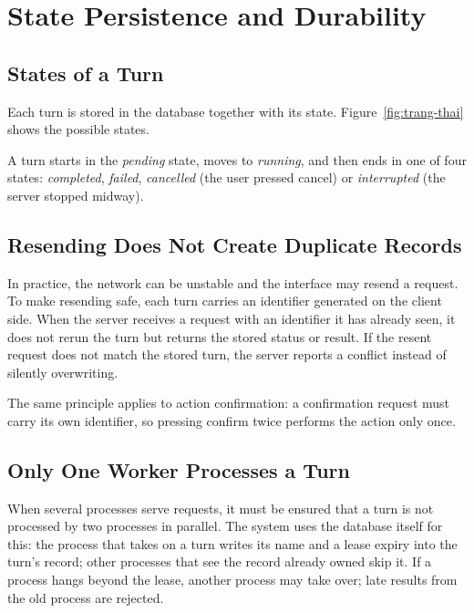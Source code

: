 \section{State Persistence and Durability}

\subsection{States of a Turn}

Each turn is stored in the database together with its state. Figure~\ref{fig:trang-thai} shows the possible states.


A turn starts in the \emph{pending} state, moves to \emph{running}, and then ends in one of four states: \emph{completed}, \emph{failed}, \emph{cancelled} (the user pressed cancel) or \emph{interrupted} (the server stopped midway).

\subsection{Resending Does Not Create Duplicate Records}

In practice, the network can be unstable and the interface may resend a request. To make resending safe, each turn carries an identifier generated on the client side. When the server receives a request with an identifier it has already seen, it does not rerun the turn but returns the stored status or result. If the resent request does not match the stored turn, the server reports a conflict instead of silently overwriting.

The same principle applies to action confirmation: a confirmation request must carry its own identifier, so pressing confirm twice performs the action only once.

\subsection{Only One Worker Processes a Turn}

When several processes serve requests, it must be ensured that a turn is not processed by two processes in parallel. The system uses the database itself for this: the process that takes on a turn writes its name and a lease expiry into the turn's record; other processes that see the record already owned skip it. If a process hangs beyond the lease, another process may take over; late results from the old process are rejected.


